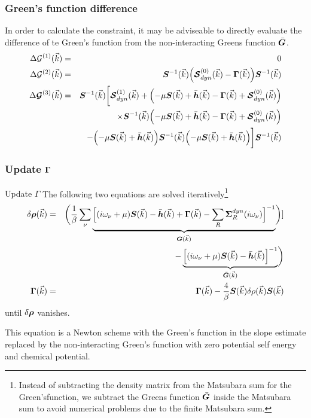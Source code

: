 \documentclass[11pt,a4paper]{report}
\begin{document}
\subsubsection{Green's function difference}
In order to calculate the constraint, it may be adviseable to directly
evaluate the difference of te Green's function from the
non-interacting Greens function $\bar{\bm{G}}$.
\begin{eqnarray}
\Delta\mathcal{G}^{(1)}(\vec{k})&=&0
\nonumber\\
\Delta\mathcal{G}^{(2)}(\vec{k})&=&\mat{S}^{-1}(\vec{k})
\Bigl(
\mat{\mathcal{S}}^{(0)}_{dyn}(\vec{k})-\mat{\Gamma}(\vec{k})
\Bigr)
\mat{S}^{-1}(\vec{k})
%
\nonumber\\
\Delta\mat{\mathcal{G}}^{(3)}(\vec{k})
&=&
\mat{S}^{-1}(\vec{k})
\biggl[
\mat{\mathcal{S}}^{(1)}_{dyn}(\vec{k})+
\Bigl(-\mu\mat{S}(\vec{k})+\bar{\mat{h}}(\vec{k})-\mat{\Gamma}(\vec{k})
+\mat{\mathcal{S}}^{(0)}_{dyn}(\vec{k})\Bigr)
\nonumber\\
&&\times\mat{S}^{-1}(\vec{k})
\Bigl(-\mu\mat{S}(\vec{k})+\bar{\mat{h}}(\vec{k})-\mat{\Gamma}(\vec{k})
+\mat{\mathcal{S}}^{(0)}_{dyn}(\vec{k})\Bigr)
\nonumber\\
&&-
\Bigl(-\mu\mat{S}(\vec{k})+\bar{\mat{h}}(\vec{k})\Bigr)
\mat{S}^{-1}(\vec{k})
\Bigl(-\mu\mat{S}(\vec{k})+\bar{\mat{h}}(\vec{k})\Bigr)
\biggr]
\mat{S}^{-1}(\vec{k})
\end{eqnarray}

\subsubsection{Update $\bm{\Gamma}$}
\begin{myshadowminipage}{Update $\Gamma$}
The following two equations are solved iteratively\footnote{Instead of
  subtracting the density matrix from the Matsubara sum for the
  Green'sfunction, we subtract the Greens function $\bar{\bm{G}}$
  inside the Matsubara sum to avoid numerical problems due to the
  finite Matsubara sum.}
\begin{eqnarray}
\delta\bm{\rho}(\vec{k})&=&
\biggl(\frac{1}{\beta}\sum_\nu
\underbrace{\Bigl[
(i\omega_\nu+\mu)\bm{S}(\vec{k})-\bar{\bm{h}}(\vec{k})+\bm{\Gamma}(\vec{k})
-\sum_R\bm{\Sigma}^{dyn}_R(i\omega_\nu)
\Bigr]^{-1}}_{\bm{G}(\vec{k})}\biggr)
\nonumber]\\
&&\hspace{1cm}-\underbrace{\Bigl[
(i\omega_\nu+\mu)\bm{S}(\vec{k})-\bar{\bm{h}}(\vec{k})\Bigr]^{-1}
}_{\bar{\bm{G}}(\vec{k})}\biggr)
\nonumber\\
\bm{\Gamma}(\vec{k})&=&\bm{\Gamma}(\vec{k})-\frac{4}{\beta}\bm{S}(\vec{k})
\delta{\rho}(\vec{k})
\bm{S}(\vec{k})
\end{eqnarray}
until $\delta\bm{\rho}$ vanishes.
\end{myshadowminipage}
This equation is a Newton scheme with the Green's function in the
slope estimate replaced by the non-interacting Green's function with
zero potential self energy and chemical potential. 
\end{document}
